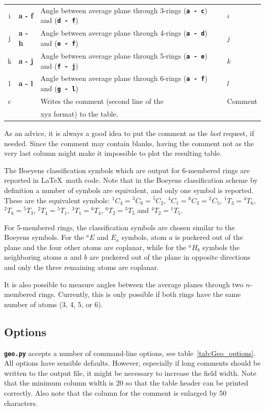 \documentclass[a4paper,10pt,DIV=15,openany,twoside=false]{scrbook}
\newcommand{\ttt}[1]{\textbf{\texttt{#1}}}
\begin{document}
\begin{table}[htb]
\begin{tabular}{>{\ttfamily}c>{\bfseries\ttfamily}lll}
    i   &a - f          &Angle between average plane through 3-rings (\ttt{a - c}) and (\ttt{d - f})      &$i$\\
    j   &a - h          &Angle between average plane through 4-rings (\ttt{a - d}) and (\ttt{e - f})      &$j$\\
    k   &a - j          &Angle between average plane through 5-rings (\ttt{a - e}) and (\ttt{f - j})      &$k$\\
    l   &a - l          &Angle between average plane through 6-rings (\ttt{a - f}) and (\ttt{g - l})      &$l$\\
    c   &               &Writes the comment (second line of the &Comment\\
                       &&xyz format) to the table.&\\
    \bottomrule
  \end{tabular}
\end{table}

As an advice, it is always a good idea to put the comment as the \textit{last} request, if needed. Since the comment may contain blanks, having the comment not as the very last column might make it impossible to plot the resulting table.

The Boeyens classification symbols which are output for 6-membered rings are reported in \LaTeX\ math code. Note that in the Boeyens classification scheme by definition a number of symbols are equivalent, and only one symbol is reported. 
These are the equivalent symbols: $^1C_4={}^3C_6={}^5C_2$, $^4C_1={}^6C_3={}^2C_5$, $^1T_3={}^4T_6$, $^2T_6={}^5T_3$, $^2T_4={}^5T_1$, $^3T_1={}^6T_4$, $^6T_2={}^3T_5$ and $^4T_2={}^1T_5$.

For 5-membered rings, the classification symbols are chosen similar to the Boeyens symbols. For the $^aE$ and $E_a$ symbols, atom $a$ is puckered out of the plane and the four other atoms are coplanar, while for the $^aH_b$ symbols the neighboring atoms $a$ and $b$ are puckered out of the plane in opposite directions and only the three remaining atoms are coplanar.

It is also possible to measure angles between the average planes through two $n$-membered rings.
Currently, this is only possible if both rings have the same number of atoms (3, 4, 5, or 6).

\subsection{Options}

\ttt{geo.py} accepts a number of command-line options, see table~\ref{tab:Geo_options}. All options have sensible defaults. However, especially if long comments should be written to the output file, it might be necessary to increase the field width. Note that the minimum column width is 20 so that the table header can be printed correctly.
Also note that the column for the comment is enlarged by 50 characters.
\end{document}
